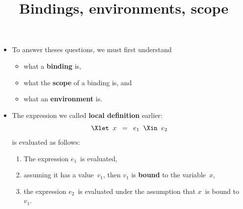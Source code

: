 \documentclass[wide]{slides}
\begin{document}
\begin{slide}
  \title{Bindings, environments, scope}

  \begin{itemize}

    \item To answer theses questions, we must first understand
      \begin{itemize}

        \item what a \textbf{binding} is,

        \item what the \textbf{scope} of a binding is, and

        \item what an \textbf{environment} is.
      \end{itemize}

    \item The expression we called \textbf{local definition} earlier:
      \begin{equation*}
        \Xlet \;\; x \;\; = \;\; e_1 \;\; \Xin \;\; e_2
      \end{equation*}
      is evaluated as follows:
      \begin{enumerate}

        \item The expression \(e_1\)~is evaluated,

        \item assuming it has a value~\(v_1\), then \(v_1\) is
          \textbf{bound} to the variable~\(x\),

        \item the expression \(e_2\)~is evaluated under the assumption
          that \(x\)~is bound to~\(v_1\).

      \end{enumerate}

  \end{itemize}

\end{slide}
\end{document}
